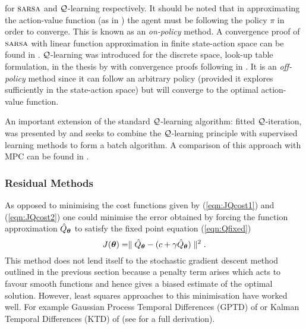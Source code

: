 for $\textsc{sarsa}$ and $\mathcal{Q}$-learning respectively. It should be noted that in approximating the action-value function (as in \SARSA) the agent must be following the policy $\pi$ in order to converge. This is known as an \textit{on-policy} method. A convergence proof of $\textsc{sarsa}$ with linear function approximation in finite state-action space can be found in \cite{TV97}. $\mathcal{Q}$-learning was introduced for the discrete space, look-up table formulation, in the thesis by \cite{Wat89} with convergence proofs following in \cite{WD92}. It is an \textit{off-policy} method since it can follow an arbitrary policy (provided it explores sufficiently in the state-action space) but will converge to the optimal action-value function. %


An important extension of the standard $\mathcal{Q}$-learning algorithm: fitted $\mathcal{Q}$-iteration, was presented by \cite{EGW05} and seeks to combine the $\mathcal{Q}$-learning principle with supervised learning methods to form a batch algorithm.
A comparison of this approach with MPC can be found in \cite{EGCW09}.


\subsubsection{Residual Methods}
As opposed to minimising the cost functions given by (\ref{eqn:JQcost1}) and (\ref{eqn:JQcost2}) one could minimise the error obtained by forcing the function approximation $\hat Q_{\boldsymbol{\theta}}$ to satisfy the fixed point equation (\ref{eqn:Qfixed})
\begin{equation*}
J(\boldsymbol{\theta}) = \parallel \hat Q_{\boldsymbol{\theta}} - (c + \gamma \hat Q_{\boldsymbol{\theta}}) \parallel^2.
\end{equation*}
This method does not lend itself to the stochastic gradient descent method outlined in the previous section because a penalty term arises which acts to favour smooth functions and hence gives a biased estimate of the optimal solution. However, least squares approaches to this minimisation have worked well. For example Gaussian Process Temporal Differences (GPTD) of \cite{EMM03,EMM05} or Kalman Temporal Differences (KTD) of \cite{GPF09} (see \cite{GP10a} for a full derivation).



